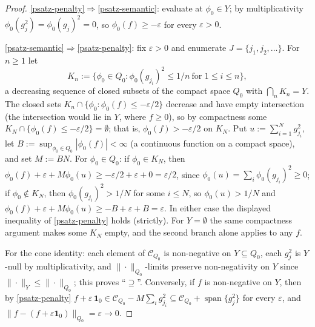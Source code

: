 \documentclass[11pt]{article}
\theoremstyle{definition}
\newcommand{\C}{\mathcal{C}}
\newcommand{\eps}{\varepsilon}
\newcommand{\one}{\mathbf 1}
\begin{document}
\begin{proof}
\ref{psatz-penalty}$\Rightarrow$\ref{psatz-semantic}: evaluate at $\phi_0\in Y$; by
multiplicativity $\phi_0(g_j^2)=\phi_0(g_j)^2=0$, so $\phi_0(f)\ge-\eps$ for every
$\eps>0$.

\ref{psatz-semantic}$\Rightarrow$\ref{psatz-penalty}: fix $\eps>0$ and enumerate
$J=\{j_1,j_2,\dots\}$.  For $n\ge1$ let
\[
  K_n:=\{\phi_0\in Q_0:\phi_0(g_{j_i})^2\le1/n\ \text{for }1\le i\le n\},
\]
a decreasing sequence of closed subsets of the compact space $Q_0$ with
$\bigcap_nK_n=Y$.  The closed sets $K_n\cap\{\phi_0:\phi_0(f)\le-\eps/2\}$ decrease and
have empty intersection (the intersection would lie in $Y$, where $f\ge0$), so by
compactness some $K_N\cap\{\phi_0(f)\le-\eps/2\}=\emptyset$; that is, $\phi_0(f)>-\eps/2$
on $K_N$.  Put $u:=\sum_{i=1}^{N}g_{j_i}^2$, let
$B:=\sup_{\phi_0\in Q_0}|\phi_0(f)|<\infty$ (a continuous function on a compact space),
and set $M:=BN$.  For $\phi_0\in Q_0$: if $\phi_0\in K_N$, then
$\phi_0(f)+\eps+M\phi_0(u)\ge-\eps/2+\eps+0=\eps/2$, since
$\phi_0(u)=\sum_i\phi_0(g_{j_i})^2\ge0$; if $\phi_0\notin K_N$, then
$\phi_0(g_{j_i})^2>1/N$ for some $i\le N$, so $\phi_0(u)>1/N$ and
$\phi_0(f)+\eps+M\phi_0(u)\ge-B+\eps+B=\eps$.  In either case the displayed inequality
of \ref{psatz-penalty} holds (strictly).  For $Y=\emptyset$ the same compactness
argument makes some $K_N$ empty, and the second branch alone applies to any $f$.

For the cone identity: each element of $\C_{Q_0}$ is non-negative on $Y\subseteq Q_0$,
each $g_j^2$ is $Y$-null by multiplicativity, and $\|\cdot\|_{Q_0}$-limits preserve
non-negativity on $Y$ since $\|\cdot\|_Y\le\|\cdot\|_{Q_0}$; this proves
``$\supseteq$''.  Conversely, if $f$ is non-negative on $Y$, then by
\ref{psatz-penalty} $f+\eps\,\one_0\in\C_{Q_0}-M\sum_ig_{j_i}^2\subseteq
\C_{Q_0}+\operatorname{span}\{g_j^2\}$ for every $\eps$, and
$\|f-(f+\eps\one_0)\|_{Q_0}=\eps\to0$.
\end{proof}
\end{document}
